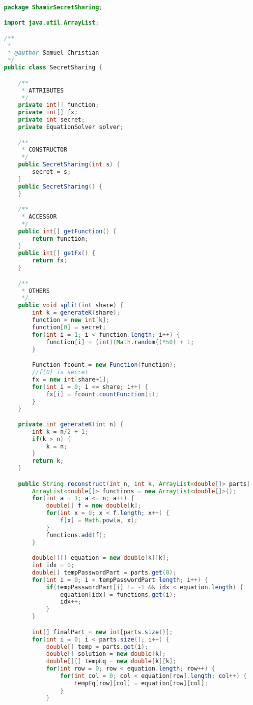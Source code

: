 \begin{lstlisting}[language=Java,basicstyle=\tiny,caption=SecretSharing.java]

package ShamirSecretSharing;

import java.util.ArrayList;

/**
 *
 * @author Samuel Christian
 */
public class SecretSharing {

    /**
     * ATTRIBUTES
     */
    private int[] function;
    private int[] fx;
    private int secret;
    private EquationSolver solver;

    /**
     * CONSTRUCTOR
     */
    public SecretSharing(int s) {
        secret = s;
    }
    public SecretSharing() {
    }

    /**
     * ACCESSOR
     */
    public int[] getFunction() {
        return function;
    }
    public int[] getFx() {
        return fx;
    }

    /**
     * OTHERS
     */
    public void split(int share) {
        int k = generateK(share);
        function = new int[k];
        function[0] = secret;
        for(int i = 1; i < function.length; i++) {
            function[i] = (int)(Math.random()*50) + 1;
        }

        Function fcount = new Function(function);
        //f(0) is secret
        fx = new int[share+1];
        for(int i = 0; i <= share; i++) {
            fx[i] = fcount.countFunction(i);
        }
    }

    private int generateK(int n) {
        int k = n/2 + 1;
        if(k > n) {
            k = n;
        }
        return k;
    }

    public String reconstruct(int n, int k, ArrayList<double[]> parts) {
        ArrayList<double[]> functions = new ArrayList<double[]>();
        for(int a = 1; a <= n; a++) {
            double[] f = new double[k];
            for(int x = 0; x < f.length; x++) {
                f[x] = Math.pow(a, x);
            }
            functions.add(f);
        }

        double[][] equation = new double[k][k];
        int idx = 0;
        double[] tempPasswordPart = parts.get(0);
        for(int i = 0; i < tempPasswordPart.length; i++) {
            if(tempPasswordPart[i] != -1 && idx < equation.length) {
                equation[idx] = functions.get(i);
                idx++;
            }
        }

        int[] finalPart = new int[parts.size()];
        for(int i = 0; i < parts.size(); i++) {
            double[] temp = parts.get(i);
            double[] solution = new double[k];
            double[][] tempEq = new double[k][k];
            for(int row = 0; row < equation.length; row++) {
                for(int col = 0; col < equation[row].length; col++) {
                    tempEq[row][col] = equation[row][col];
                }
            }


\end{lstlisting}
